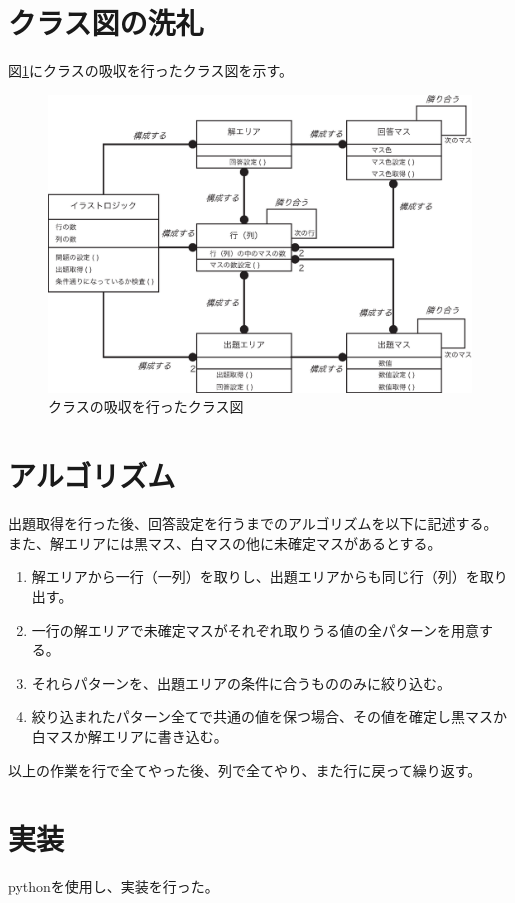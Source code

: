 \documentclass[a4j]{jarticle}
\begin{document}
\section{クラス図の洗礼}
図\ref{fig:class-absorption}にクラスの吸収を行ったクラス図を示す。

\begin{figure}[hp]
\centering
\includegraphics[width=15cm]{./image/class-absorption.eps}
\caption{クラスの吸収を行ったクラス図}
\label{fig:class-absorption}
\end{figure}

\section{アルゴリズム}
出題取得を行った後、回答設定を行うまでのアルゴリズムを以下に記述する。
また、解エリアには黒マス、白マスの他に未確定マスがあるとする。

\begin{enumerate}
 \item 解エリアから一行（一列）を取りし、出題エリアからも同じ行（列）を取り出す。
 \item 一行の解エリアで未確定マスがそれぞれ取りうる値の全パターンを用意する。
 \item それらパターンを、出題エリアの条件に合うもののみに絞り込む。
 \item 絞り込まれたパターン全てで共通の値を保つ場合、その値を確定し黒マスか白マスか解エリアに書き込む。
\end{enumerate}
以上の作業を行で全てやった後、列で全てやり、また行に戻って繰り返す。

\section{実装}
pythonを使用し、実装を行った。
\end{document}

